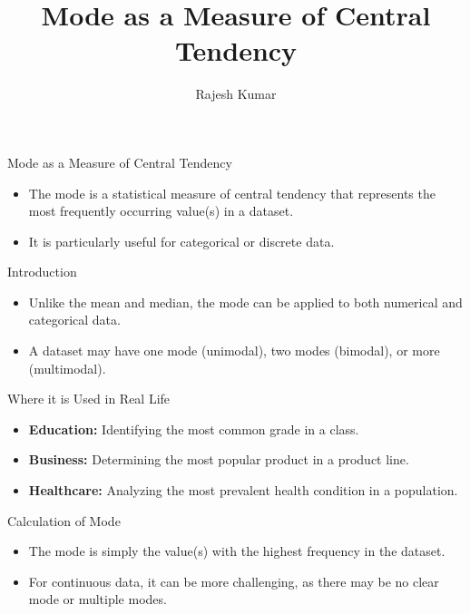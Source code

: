 \title{Mode as a Measure of Central Tendency}
\author{Rajesh Kumar}
\date{}

\begin{frame}
  \titlepage
\end{frame}

\begin{frame}{Mode as a Measure of Central Tendency}
  \begin{itemize}
    \item The mode is a statistical measure of central tendency that represents the most frequently occurring value(s) in a dataset.
    \item It is particularly useful for categorical or discrete data.
  \end{itemize}
\end{frame}

\begin{frame}{Introduction}
  \begin{itemize}
    \item Unlike the mean and median, the mode can be applied to both numerical and categorical data.
    \item A dataset may have one mode (unimodal), two modes (bimodal), or more (multimodal).
  \end{itemize}
\end{frame}

\begin{frame}{Where it is Used in Real Life}
  \begin{itemize}
    \item \textbf{Education:} Identifying the most common grade in a class.
    \item \textbf{Business:} Determining the most popular product in a product line.
    \item \textbf{Healthcare:} Analyzing the most prevalent health condition in a population.
  \end{itemize}
\end{frame}

\begin{frame}{Calculation of Mode}
  \begin{itemize}
    \item The mode is simply the value(s) with the highest frequency in the dataset.
    \item For continuous data, it can be more challenging, as there may be no clear mode or multiple modes.
  \end{itemize}
\end{frame}

